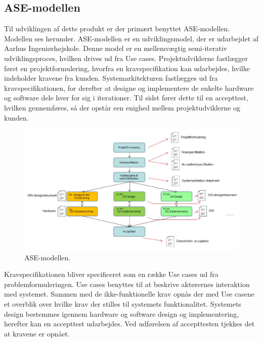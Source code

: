\subsection{ASE-modellen}
Til udviklingen af dette produkt er der primært benyttet ASE-modellen. Modellen ses herunder. ASE-modellen er en udviklingsmodel, der er udarbejdet af Aarhus Ingeniørhøjskole. Denne model er en mellemvægtig semi-iterativ udviklingsproces, hvilken drives ud fra Use cases. Projektudviklerne fastlægger først en projektformulering, hvorfra en kravspecifikation kan udarbejdes, hvilke indeholder kravene fra kunden. Systemarkitekturen fastlægges ud fra kravspecifikationen, for derefter at designe og implementere de enkelte hardware og software dele hver for sig i iterationer. Til sidst fører dette til en accepttest, hvilken gennemføres, så der opstår een enighed mellem projektudviklerne og kunden.
\begin{figure}[H]
\includegraphics[width =1.0\textwidth , center]{billeder/ASEmodellen}
\caption{ASE-modellen.}
\end{figure} 
Kravspecifikationen bliver specificeret som en række Use cases ud fra problemformuleringen. Use cases benyttes til at beskrive aktørernes interaktion med systemet. Sammen med de ikke-funktionelle krav opnås der med Use casene et overblik over hvilke krav der stilles til systemets funktionalitet. Systemets design bestemmes igennem hardware og software design og implementering, herefter kan en accepttest udarbejdes. Ved udførelsen af accepttesten tjekkes det at kravene er opnået.
